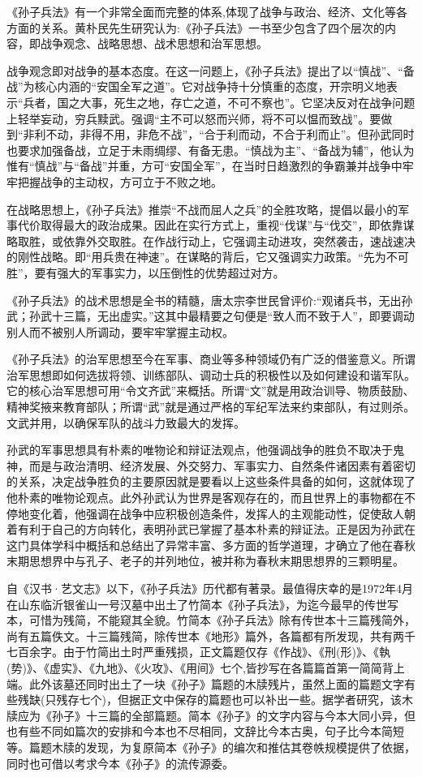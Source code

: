 \documentclass[12pt,UTF8]{ctexbook}
\begin{document}
《孙子兵法》有一个非常全面而完整的体系,体现了战争与政治、经济、文化等各方面的关系。黄朴民先生研究认为:《孙子兵法》一书至少包含了四个层次的内容，即战争观念、战略思想、战术思想和治军思想。

战争观念即对战争的基本态度。在这一问题上，《孙子兵法》提出了以“慎战”、“备战”为核心内涵的“安国全军之道”。它对战争持十分慎重的态度，开宗明义地表示“兵者，国之大事，死生之地，存亡之道，不可不察也”。它坚决反对在战争问题上轻举妄动，穷兵黩武。强调“主不可以怒而兴师，将不可以愠而致战”。要做到“非利不动，非得不用，非危不战”，“合于利而动，不合于利而止”。但孙武同时也要求加强备战，立足于未雨绸缪、有备无患。“慎战为主”、“备战为辅”，他认为惟有“慎战”与“备战”并重，方可“安国全军”，在当时日趋激烈的争霸兼并战争中牢牢把握战争的主动权，方可立于不败之地。

在战略思想上，《孙子兵法》推崇“不战而屈人之兵”的全胜攻略，提倡以最小的军事代价取得最大的政治成果。因此在实行方式上，重视“伐谋”与“伐交”，即依靠谋略取胜，或依靠外交取胜。在作战行动上，它强调主动进攻，突然袭击，速战速决的刚性战略。即“用兵贵在神速”。在谋略的背后，它又强调实力政策。“先为不可胜”，要有强大的军事实力，以压倒性的优势超过对方。

《孙子兵法》的战术思想是全书的精髓，唐太宗李世民曾评价:“观诸兵书，无出孙武；孙武十三篇，无出虚实。”这其中最精要之句便是“致人而不致于人”，即要调动别人而不被别人所调动，要牢牢掌握主动权。

《孙子兵法》的治军思想至今在军事、商业等多种领域仍有广泛的借鉴意义。所谓治军思想即如何选拔将领、训练部队、调动士兵的积极性以及如何建设和谐军队。它的核心治军思想可用“令文齐武”来概括。所谓“文”就是用政治训导、物质鼓励、精神奖掖来教育部队；所谓“武”就是通过严格的军纪军法来约束部队，有过则杀。文武并用，以确保军队的战斗力致最大的发挥。

孙武的军事思想具有朴素的唯物论和辩证法观点，他强调战争的胜负不取决于鬼神，而是与政治清明、经济发展、外交努力、军事实力、自然条件诸因素有着密切的关系，决定战争胜负的主要原因就是要看以上这些条件具备的如何，这就体现了他朴素的唯物论观点。此外孙武认为世界是客观存在的，而且世界上的事物都在不停地变化着，他强调在战争中应积极创造条件，发挥人的主观能动性，促使敌人朝着有利于自己的方向转化，表明孙武已掌握了基本朴素的辩证法。正是因为孙武在这门具体学科中概括和总结出了异常丰富、多方面的哲学道理，才确立了他在春秋末期思想界中与孔子、老子的并列地位，被并称为春秋末期思想界的三颗明星。

自《汉书·艺文志》以下，《孙子兵法》历代都有著录。最值得庆幸的是1972年4月在山东临沂银雀山一号汉墓中出土了竹简本《孙子兵法》，为迄今最早的传世写本，可惜为残简，不能窥其全貌。竹简本《孙子兵法》除有传世本十三篇残简外，尚有五篇佚文。十三篇残简，除传世本《地形》篇外，各篇都有所发现，共有两千七百余字。由于竹简出土时严重残损，正文篇题仅存《作战》、《刑(形)》、《執(势)》、《虚实》、《九地》、《火攻》、《用间》七个,皆抄写在各篇篇首第一简简背上端。此外该墓还同时出土了一块《孙子》篇题的木牍残片，虽然上面的篇题文字有些残缺(只残存七个)，但据正文中保存的篇题也可以补出一些。据学者研究，该木牍应为《孙子》十三篇的全部篇题。简本《孙子》的文字内容与今本大同小异，但也有些不同如篇次的安排和今本也不尽相同，文辞比今本古奥，句子比今本简短等。篇题木牍的发现，为复原简本《孙子》的编次和推估其卷帙规模提供了依据，同时也可借以考求今本《孙子》的流传源委。
\end{document}
